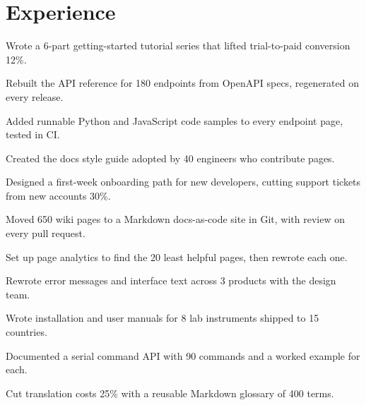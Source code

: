 \documentclass[]{deedy-resume-openfont}
\begin{document}
\begin{minipage}[t]{0.66\textwidth}

\section{Experience}
\vspace{\topsep} %
\begin{tightemize}
\item Wrote a 6-part getting-started tutorial series that lifted trial-to-paid conversion 12\%. %
\item Rebuilt the API reference for 180 endpoints from OpenAPI specs, regenerated on every release. %
\item Added runnable Python and JavaScript code samples to every endpoint page, tested in CI. %
\item Created the docs style guide adopted by 40 engineers who contribute pages. %
\end{tightemize}
\sectionsep
{}
\vspace{\topsep} %
\begin{tightemize}
\item Designed a first-week onboarding path for new developers, cutting support tickets from new accounts 30\%. %
\item Moved 650 wiki pages to a Markdown docs-as-code site in Git, with review on every pull request. %
\item Set up page analytics to find the 20 least helpful pages, then rewrote each one. %
\item Rewrote error messages and interface text across 3 products with the design team. %
\end{tightemize}
\sectionsep
{}
\vspace{\topsep} %
\begin{tightemize}
\item Wrote installation and user manuals for 8 lab instruments shipped to 15 countries. %
\item Documented a serial command API with 90 commands and a worked example for each. %
\item Cut translation costs 25\% with a reusable Markdown glossary of 400 terms. %
\end{tightemize}
\sectionsep


\end{minipage}
\end{document}
